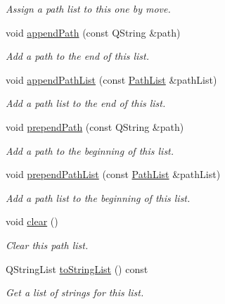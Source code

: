 \begin{DoxyCompactItemize}
\begin{DoxyCompactList}\small\item\em Assign a path list to this one by move. \end{DoxyCompactList}\item 
void \hyperlink{class_mdt_1_1_deploy_utils_1_1_path_list_a2d8d99897e5a693e761f6df4523b115c}{append\+Path} (const Q\+String \&path)
\begin{DoxyCompactList}\small\item\em Add a path to the end of this list. \end{DoxyCompactList}\item 
void \hyperlink{class_mdt_1_1_deploy_utils_1_1_path_list_a1d83d10599fac6d015a6779153364ab3}{append\+Path\+List} (const \hyperlink{class_mdt_1_1_deploy_utils_1_1_path_list}{Path\+List} \&path\+List)
\begin{DoxyCompactList}\small\item\em Add a path list to the end of this list. \end{DoxyCompactList}\item 
void \hyperlink{class_mdt_1_1_deploy_utils_1_1_path_list_a3fcd8dbdb27b4ead271623a46fa81b38}{prepend\+Path} (const Q\+String \&path)
\begin{DoxyCompactList}\small\item\em Add a path to the beginning of this list. \end{DoxyCompactList}\item 
void \hyperlink{class_mdt_1_1_deploy_utils_1_1_path_list_a681de54da92349f89f1df37c876e0c67}{prepend\+Path\+List} (const \hyperlink{class_mdt_1_1_deploy_utils_1_1_path_list}{Path\+List} \&path\+List)
\begin{DoxyCompactList}\small\item\em Add a path list to the beginning of this list. \end{DoxyCompactList}\item 
void \hyperlink{class_mdt_1_1_deploy_utils_1_1_path_list_a341e4b7de4f7c6ed11769bd4449aa013}{clear} ()
\begin{DoxyCompactList}\small\item\em Clear this path list. \end{DoxyCompactList}\item 
Q\+String\+List \hyperlink{class_mdt_1_1_deploy_utils_1_1_path_list_afd40c0f5d21c285bb5f1778a8832167e}{to\+String\+List} () const 
\begin{DoxyCompactList}\small\item\em Get a list of strings for this list. \end{DoxyCompactList}\item 

\end{DoxyCompactItemize}
